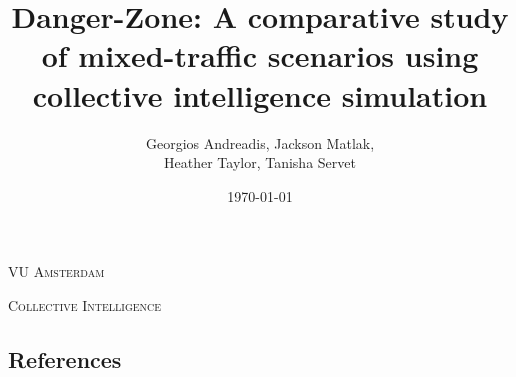 \documentclass[12pt,a4paper]{report}
\title{Danger-Zone: A comparative study of mixed-traffic scenarios using collective intelligence simulation}
\author{
Georgios Andreadis, Jackson Matlak,\\
Heather Taylor, Tanisha Servet
}
\date{\today}
\begin{document}
    \begin{titlepage}
        \centering

        {\scshape\LARGE VU Amsterdam \par}
        \vspace{1cm}
        {\scshape\Large Collective Intelligence\par}
        \vspace{5cm}

        {\huge\bfseries\sffamily \thetitle \par}
        \par\vspace{1cm}
        {\Large\itshape \theauthor \par}

        \vfill

        {\large \thedate \par}
    \end{titlepage}

    \listoftodos

    
    \tableofcontents
    
    
    
    
    
    
    

    \begin{appendices}
        \chapter{References}
        \printbibliography[heading=none]
        
    \end{appendices}
\end{document}
